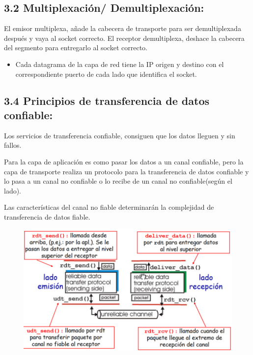 \documentclass[12pt, twoside, openright]{report} %
\begin{document}
\subsection{3.2 Multiplexación/ Demultiplexación:}


    El emisor multiplexa, añade la cabecera de transporte para ser
    demultiplexada después y vaya al socket correcto.
    El receptor demultiplexa, deshace la cabecera del segmento para
    entregarlo al socket correcto.

    \begin{itemize}
    \item
      Cada datagrama de la capa de red tiene la IP origen y destino con
      el correspondiente puerto de cada lado que identifica el socket.
    \end{itemize}

\subsection{3.4 Principios de transferencia de datos confiable:}

    Los servicios de transferencia confiable, consiguen que los datos
    lleguen y sin fallos.

	Para la capa de aplicación es como pasar los datos a un canal
    confiable, pero la capa de transporte realiza un protocolo para la
    transferencia de datos confiable y lo pasa a un canal no confiable o
    lo recibe de un canal no confiable(según el lado).

	Las características del canal no fiable determinarán la complejidad
    de transferencia de datos fiable.

	\begin{figure}[H]
		{\includegraphics[scale=.35]{Untitled 9.png}}
	\end{figure}
\end{document}
